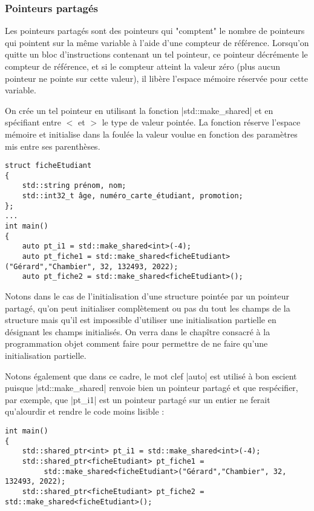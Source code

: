 \subsubsection{Pointeurs partagés}

Les pointeurs partagés sont des pointeurs qui "comptent" le nombre de pointeurs qui pointent sur la même variable à l'aide d'une compteur de référence. 
Lorsqu'on quitte un bloc d'instructions contenant un tel pointeur, ce pointeur décrémente le compteur de référence, et si le compteur atteint la valeur zéro (plus aucun pointeur ne pointe sur cette valeur), il libère l'espace mémoire réservée pour cette variable.

On crée un tel pointeur en utilisant la fonction |std::make_shared| et en  spécifiant entre $<$ et $>$ le type de valeur pointée. La fonction réserve l'espace mémoire et initialise dans la foulée la valeur voulue en fonction des paramètres mis entre ses parenthèses.

\begin{lstlisting}[caption=Exemple de création de pointeurs partagés]
struct ficheEtudiant
{
    std::string prénom, nom;
    std::int32_t âge, numéro_carte_étudiant, promotion;
};
...
int main()
{
    auto pt_i1 = std::make_shared<int>(-4);
    auto pt_fiche1 = std::make_shared<ficheEtudiant>("Gérard","Chambier", 32, 132493, 2022);
    auto pt_fiche2 = std::make_shared<ficheEtudiant>();

\end{lstlisting}

Notons dans le cas de l'initialisation d'une structure pointée par un pointeur partagé, qu'on peut
initialiser complètement ou pas du tout les champs de la structure mais qu'il est impossible 
d'utiliser une initialisation partielle en désignant les champs initialisés. On verra 
dans le chapître consacré à la programmation objet comment faire pour permettre de ne faire qu'une initialisation partielle.

Notons également que dans ce cadre, le mot clef |auto| est utilisé à bon escient puisque
|std::make_shared| renvoie bien un pointeur partagé et que respécifier, par exemple, que
|pt_i1| est un pointeur partagé sur un entier ne ferait qu'alourdir et rendre le code moins lisible :
\begin{lstlisting}[caption=Même exemple sans auto]
int main()
{
    std::shared_ptr<int> pt_i1 = std::make_shared<int>(-4);
    std::shared_ptr<ficheEtudiant> pt_fiche1 = 
         std::make_shared<ficheEtudiant>("Gérard","Chambier", 32, 132493, 2022);
    std::shared_ptr<ficheEtudiant> pt_fiche2 = std::make_shared<ficheEtudiant>();

\end{lstlisting}


